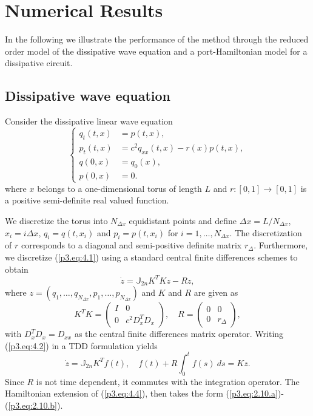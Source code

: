 \section{Numerical Results} \label{p3.sec:4}
In the following we illustrate the performance of the method through the reduced order model of the dissipative wave equation and a port-Hamiltonian model for a dissipative circuit.

\subsection{Dissipative wave equation} \label{sec:4.1}

Consider the dissipative linear wave equation
\begin{equation} \label{p3.eq:4.1}
	\left\{
	\begin{aligned}
		q_{t}(t,x) &= p(t,x), \\
		p_{t}(t,x) &= c^2 q_{xx}(t,x) - r(x)  p(t,x) , \\
		q(0,x) &= q_0(x), \\
		p(0,x) &= 0.
	\end{aligned}
	\right.
\end{equation}
where $x$ belongs to a one-dimensional torus of length $L$ and $r:[0,1]\to[0,1]$ is a positive semi-definite real valued function. 

We discretize the torus into $N_{\Delta x}$ equidistant points and define $\Delta x = L/N_{\Delta x}$, $x_i = i\Delta x$, $q_i=q(t,x_i)$ and $p_i=p(t,x_i)$ for $i = 1, \dots, N_{\Delta x}$. The discretization of $r$ corresponds to a diagonal and semi-positive definite matrix $r_\Delta$. Furthermore, we discretize (\ref{p3.eq:4.1}) using a standard central finite differences schemes to obtain
\begin{equation} \label{p3.eq:4.2}
	\dot z = \mathbb J_{2n} K^T K z - R z,
\end{equation}
where $z = (q_1,\dots,q_{N_{\Delta x}},p_1,\dots,p_{N_{\Delta x}})$ and $K$ and $R$ are given as
\begin{equation} \label{p3.eq:4.3}
	K^T K =
	\begin{pmatrix}
		I & 0 \\
		0 & c^2D_x^TD_x
	\end{pmatrix} , \quad
	R =
	\begin{pmatrix}
		0 & 0 \\
		0 & r_\Delta
	\end{pmatrix},
\end{equation}
with $D_x^TD_x = D_{xx}$ as the central finite differences matrix operator. Writing (\ref{p3.eq:4.2}) in a TDD formulation yields
\begin{equation} \label{p3.eq:4.4}
	\dot z = \mathbb J_{2n} K^T f(t), \quad f(t) + R \int_0^t f(s) \ ds = K z.
\end{equation}
Since $R$ is not time dependent, it commutes with the integration operator. The Hamiltonian extension of (\ref{p3.eq:4.4}), then takes the form (\ref{p3.eq:2.10.a})-(\ref{p3.eq:2.10.b}).

